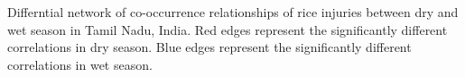 Differntial network of co-occurrence relationships of rice injuries between dry and wet season in Tamil Nadu, India. Red edges represent the significantly different correlations in dry season. Blue edges represent the significantly different correlations in wet season.